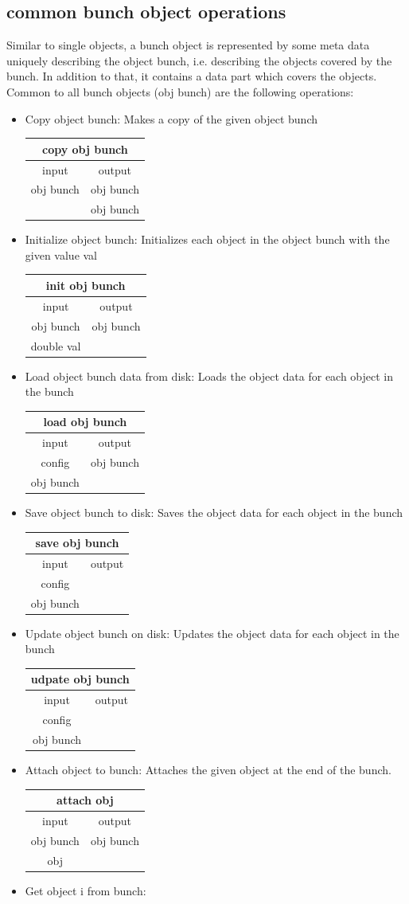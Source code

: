 \documentclass[12pt,a4paper]{article}
\newcommand{\bet}[1]{\begin{center}
		     \begin{tabular}{|c|c|}
		     \hline
		     \multicolumn{2}{|c|}{#1}\\
		     \hline\hline
		     input & output \\
                     \hline}
\newcommand{\eet}{\hline
		  \end{tabular}
		  \end{center}}
\begin{document}
\subsection{common bunch object operations}

Similar to single objects, a bunch object is represented by some meta
data uniquely describing the object bunch, i.e. describing the objects covered 
by the bunch. In addition to that, it contains a data part which covers the 
objects. Common to all bunch objects (obj bunch) are the following operations:
%
\begin{itemize}
\item Copy object bunch:
\newline
Makes a copy of the given object bunch 
\bet{copy obj bunch}
obj bunch & obj bunch \\
          & obj bunch \\
\eet
\item Initialize object bunch:
\newline
Initializes each object in the object bunch 
with the given value val 
\bet{init obj bunch}
obj bunch & obj bunch\\
double val& \\
\eet
\item Load object bunch data from disk:
\newline 
Loads the object data for each object in the bunch
\bet{load obj bunch}
config & obj bunch \\
obj bunch & \\
\eet
\item Save object bunch to disk:
\newline
Saves the object data for each object in the bunch
\bet{save obj bunch}
config & \\
obj bunch & \\
\eet
\item Update object bunch on disk:
\newline
Updates the object data for each object in the bunch
\bet{udpate obj bunch}
config &   \\
obj bunch& \\
\eet
\item Attach object to bunch:
\newline
Attaches the given object at the end of the bunch. 
\bet{attach obj}
obj bunch & obj bunch\\
obj & \\
\eet
\item Get object i from bunch:
\newline

\end{itemize}
\end{document}
